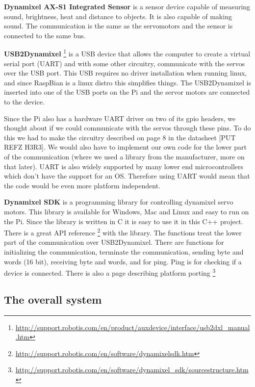 \textbf{Dynamixel AX-S1 Integrated Sensor}
is a sensor device capable of measuring sound, brightness, heat and distance to objects. It is also capable of making sound. The communication is the same as the servomotors and the sensor is connected to the same bus. 
\bigskip

\textbf{USB2Dynamixel} \footnote{\url{http://support.robotis.com/en/product/auxdevice/interface/usb2dxl_manual.htm}} is a USB device that allows the computer to create a virtual serial port (UART) and with some other circuitry, communicate with the servos over the USB port.
This USB requires no driver installation when running linux, and since RaspBian is a linux distro this simplifies things. 
The USB2Dynamixel is inserted into one of the USB ports on the Pi and the servor motors are connected to the device.

Since the Pi also has a hardware UART driver on two of its gpio headers, we thought about if we could communicate with the servos through these pins. 
To do this we had to make the circuitry described on page 8 in the datasheet [PUT REFZ H3R3]. 
We would also have to implement our own code for the lower part of the communication (where we used a library from the manufacturer, more on that later).
UART is also widely supported by many lower end microcontrollers which don't have the support for an OS. 
Therefore using UART would mean that the code would be even more platform independent.
\bigskip

\textbf{Dynamixel SDK} is a programming library for controlling dynamixel servo motors. 
This library is available for Windows, Mac and Linux and easy to run on the Pi. 
Since the library is written in C it is easy to use it in this C++ project.
There is a great API reference \footnote{\url{http://support.robotis.com/en/software/dynamixelsdk.htm}} with the library.
The functions treat the lower part of the communication over USB2Dynamixel.
There are functions for initializing the communication, terminate the communication, sending byte and words (16 bit), receiving byte and words, and for ping. Ping is for checking if a device is connected.
There is also a page describing platform porting \footnote{\url{http://support.robotis.com/en/software/dynamixel_sdk/sourcestructure.htm}}


\subsection{The overall system}

